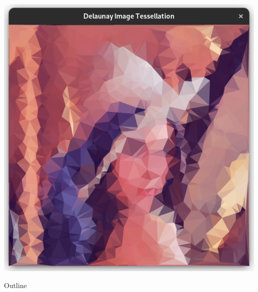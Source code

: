 \documentclass[aspectratio=169,fleqn]{beamer}
\begin{document}
\begin{frame}[plain]{}
  \centering
  \includegraphics[height=\textheight,trim={10px 10 10 45},clip]{images/lenna-tessellation.png}
\end{frame}

\frame[plain]{\titlepage}
\begin{frame}[plain]{Outline}
  \footnotesize
  \hfill\parbox[t][7cm][l]{0.9\textwidth}{\tableofcontents}
\end{frame}

\setcounter{framenumber}{0}
\end{document}
